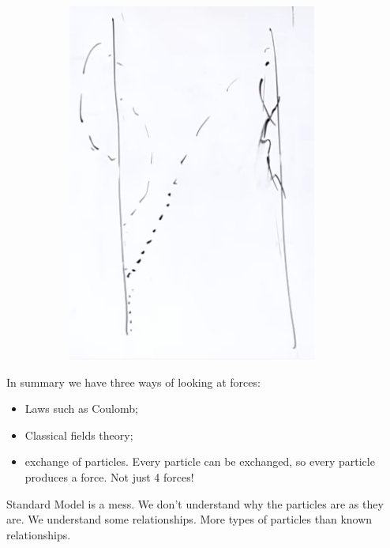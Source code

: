 \documentclass[]{article}
\begin{document}
\begin{figure}[H]
\begin{subfigure}{0.45\textwidth}
		\includegraphics[width=0.9\textwidth]{2-1-second-electron-photons-feynman}
	\end{subfigure}
\end{figure}

In summary we have three ways of looking at forces:

\begin{itemize}
	\item Laws such as Coulomb;
	\item Classical fields theory;
	\item exchange of particles. Every particle can be exchanged, so every particle produces a force. Not just 4 forces! 
\end{itemize}

Standard Model is a mess. We don't understand why the particles are as they are. We understand some relationships. More types of particles than known relationships.
\end{document}
